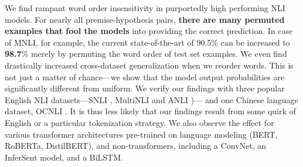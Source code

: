\documentclass[12pt]{article}
\newcommand{\xit}[1]{{\noindent\textbf{\textit{#1}}}}
\begin{document}
We find rampant word order insensitivity in purportedly high performing NLI models. For nearly all premise-hypothesis pairs, \textbf{there are many permuted examples that fool the models} into providing the correct prediction. In case of MNLI, for example, the current state-of-the-art of 90.5\% can be increased to \textbf{98.7}\% merely by permuting the word order of test set examples. We even find drastically increased cross-dataset generalization when we reorder words. This is not just a matter of chance---we show that the model output probabilities are significantly different from uniform.
We verify our findings with three popular English NLI datasets---SNLI \citep{bowman-etal-2015-large}, MultiNLI \citep{williams-etal-2018-broad} and ANLI \citep{nie-etal-2020-adversarial})---
and one Chinese language dataset, OCNLI \cite{hu-etal-2020-ocnli}. It is thus less likely that our findings result from some quirk of English or a particular tokenization strategy.
We also observe the effect for various transformer architectures pre-trained on language modeling (BERT, RoBERTa, DistilBERT), and non-transformers, including a ConvNet, an InferSent model, and a BiLSTM.


\end{document}
